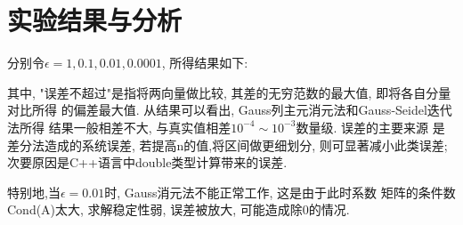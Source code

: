 \documentclass[12pt,a4paper,oneside]{article}
\begin{document}
\section{实验结果与分析}
分别令$\epsilon = 1,0.1, 0.01, 0.0001$, 所得结果如下:
\begin{figure}[H]
    \centering
    \hspace{0.5in} 
\end{figure}
其中, "误差不超过"是指将两向量做比较, 其差的无穷范数的最大值, 即将各自分量对比所得
的偏差最大值. 从结果可以看出, Gauss列主元消元法和Gauss-Seidel迭代法所得
结果一般相差不大, 与真实值相差$10^{-4}\sim 10^{-3}$数量级. 误差的主要来源
是差分法造成的系统误差, 若提高n的值,将区间做更细划分, 则可显著减小此类误差;
次要原因是C++语言中double类型计算带来的误差.\par
特别地,当$\epsilon = 0.01$时, Gauss消元法不能正常工作, 这是由于此时系数
矩阵的条件数Cond(A)太大, 求解稳定性弱, 误差被放大, 可能造成除0的情况.
\end{document}
